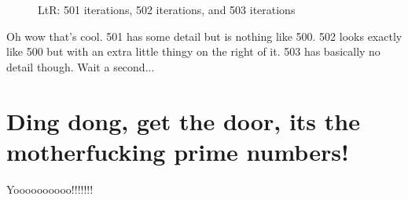 \documentclass[letterpaper,12pt]{article}
\begin{document}
\begin{figure}[h]
	\noindent{}
	\centering
	\caption{LtR: 501 iterations, 502 iterations, and 503 iterations}
\end{figure}

Oh wow that's cool. 501 has some detail but is nothing like 500. 502 looks exactly like 500 but with an extra little thingy on the right of it.
503 has basically no detail though. Wait a second...

\section{Ding dong, get the door, its the motherfucking prime numbers!}

Yoooooooooo!!!!!!!
\end{document}
